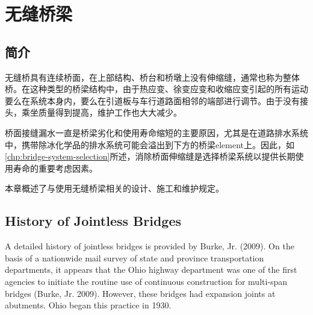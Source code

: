 \chapter{无缝桥梁}
\label{chp:jointless-bridge}
\section{简介}
无缝桥具有连续桥面，在上部结构、桥台和桥墩上没有伸缩缝，通常也称为整体桥。在这种类型的桥梁结构中，由于热应变、徐变应变和收缩应变引起的所有运动要么在系统本身内，要么在引道板与车行道路面相邻的端部进行调节。由于没有接头，乘坐质量得到提高，维护工作也大大减少。


桥面接缝漏水一直是桥梁劣化和使用寿命缩短的主要原因，尤其是在道路排水系统中，携带除冰化学品的排水系统可能会溢出到下方的桥梁\gls{element}上。因此，如\cref{chp:bridge-system-selection}所述，消除桥面伸缩缝是选择桥梁系统以提供长期使用寿命的重要考虑因素。

本章概述了与使用无缝桥梁相关的设计、施工和维护规定。

\section{History of Jointless Bridges}
A detailed history of jointless bridges is provided by Burke, Jr. (2009). On the basis of a nationwide mail survey of state and province transportation departments, it appears that the Ohio highway department was one of the first agencies to initiate the routine use of continuous construction for multi-span bridges (Burke, Jr. 2009). However, these bridges had expansion joints at abutments. Ohio began this practice in 1930.

